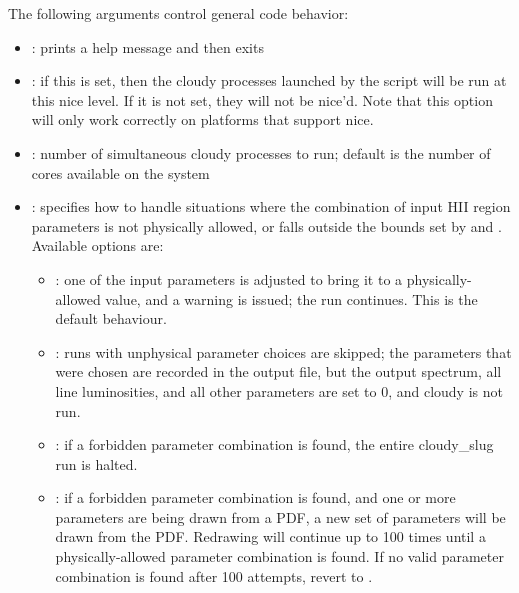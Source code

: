 \documentclass[letterpaper,10pt,english]{sphinxmanual}
\begin{document}
The following arguments control general code behavior:
\begin{itemize}
\item {} 
: prints a help message and then exits

\item {} 
: if this is set, then the
cloudy processes launched by the script will be run at this nice
level. If it is not set, they will not be nice’d. Note that this
option will only work correctly on platforms that support nice.

\item {} 
: number of simultaneous cloudy processes
to run; default is the number of cores available on the system

\item {} 
: specifies how to
handle situations where the combination of input HII region
parameters is not physically allowed, or falls outside the bounds
set by  and . Available options are:
\begin{itemize}
\item {} 
: one of the input parameters is adjusted to bring it
to a physically-allowed value, and a warning is issued; the run
continues. This is the default behaviour.

\item {} 
: runs with unphysical parameter choices are skipped; the
parameters that were chosen are recorded in the output file, but
the output spectrum, all line luminosities, and all other
parameters are set to 0, and cloudy is not run.

\item {} 
: if a forbidden parameter combination is found, the
entire cloudy\_slug run is halted.

\item {} 
: if a forbidden parameter combination is found, and
one or more parameters are being drawn from a PDF, a new set of
parameters will be drawn from the PDF. Redrawing will continue up
to 100 times until a physically-allowed parameter combination is
found. If no valid parameter combination is found after 100
attempts, revert to .

\end{itemize}


\end{itemize}
\end{document}
